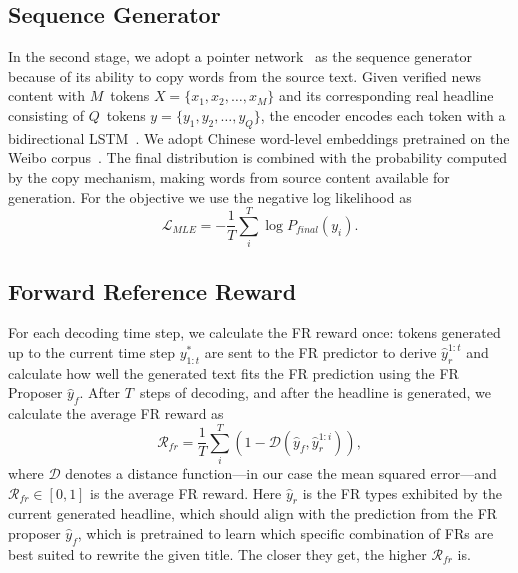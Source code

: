 \subsection{Sequence Generator}
\label{subsec_seq_gen}
In the second stage, we adopt a pointer network~\cite{see-etal-2017-get} as the
sequence generator because of its ability to copy words from the source text.
Given verified news content with $M$~tokens $ X=\{x_1, x_2, \ldots, x_M \}$
and its corresponding real headline consisting of $Q$~tokens $ y=\{ y_1, y_2,
\ldots, y_Q \}$, the encoder encodes each token with a bidirectional
LSTM~\cite{1997lstm}.
We adopt Chinese word-level embeddings pretrained on the Weibo corpus~\cite{2018chemb}. The final distribution is
combined with the probability computed by the copy mechanism, making words from source content available for generation. For the objective we use the negative log likelihood as
\begin{equation}
    \mathcal{L}_{\mathit{MLE}} = - \frac{1}{T} \sum_i^{T} \log P_{\mathit{final}}(y_i).
\end{equation}


\subsection{Forward Reference Reward}
\label{subsec_fr_reward}
For each decoding time step, we calculate the FR reward once:
tokens generated up to the current time step $y^{*}_{1:t}$ are sent to the FR
predictor to derive $\hat{y}_{r}^{1:t}$ and calculate how well the generated
text fits the FR prediction using the FR Proposer $\hat{y}_{f}$. 
  After $T$~steps of decoding, and after the headline is generated,   %
we calculate the average FR reward as
\begin{equation}
    \mathcal{R}_{\mathit{fr}} = \frac{1}{T}\sum_i^T(1 - \mathcal{D}(\hat{y}_{f}, \hat{y}_{r}^{1:i})),
\end{equation}
where $\mathcal{D}$ denotes a distance function---in our case the mean squared
error---and $\mathcal{R}_{\mathit{fr}} \in [0, 1]$ is the average FR reward. 
Here $\hat{y}_{r}$ is the FR types
exhibited by the current generated headline, which should align
with the prediction from the FR proposer $\hat{y}_{f}$, which is pretrained to learn
which specific combination of FRs are best suited to rewrite the given title. The
closer they get, the higher $\mathcal{R}_{\mathit{fr}}$ is. 

